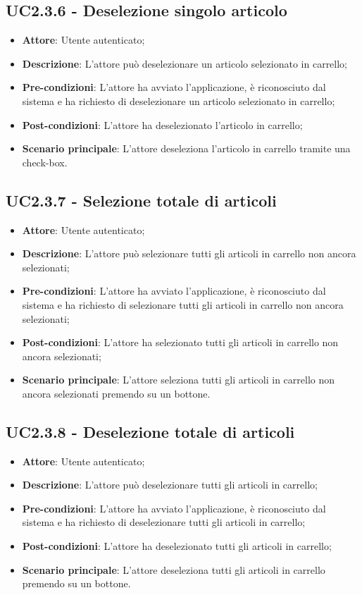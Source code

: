 \subsection{UC2.3.6 - Deselezione singolo articolo}

\begin{itemize}
	\item \textbf{Attore}: Utente autenticato;
	\item \textbf{Descrizione}: L'attore può deselezionare un articolo selezionato in carrello;
	\item \textbf{Pre-condizioni}: L'attore ha avviato l'applicazione, è riconosciuto dal sistema e ha richiesto di deselezionare un articolo selezionato in carrello;
	\item \textbf{Post-condizioni}: L'attore ha deselezionato l'articolo in carrello;
	\item \textbf{Scenario principale}: L'attore deseleziona l'articolo in carrello tramite una check-box.
\end{itemize}

\subsection{UC2.3.7 - Selezione totale di articoli}

\begin{itemize}
	\item \textbf{Attore}: Utente autenticato;
	\item \textbf{Descrizione}: L'attore può selezionare tutti gli articoli in carrello non ancora selezionati;
	\item \textbf{Pre-condizioni}: L'attore ha avviato l'applicazione, è riconosciuto dal sistema e ha richiesto di selezionare tutti gli articoli in carrello non ancora selezionati;
	\item \textbf{Post-condizioni}: L'attore ha selezionato tutti gli articoli in carrello non ancora selezionati;
	\item \textbf{Scenario principale}: L'attore seleziona tutti gli articoli in carrello non ancora selezionati premendo su un bottone.
\end{itemize}

\subsection{UC2.3.8 - Deselezione totale di articoli}

\begin{itemize}
	\item \textbf{Attore}: Utente autenticato;
	\item \textbf{Descrizione}: L'attore può deselezionare tutti gli articoli in carrello;
	\item \textbf{Pre-condizioni}: L'attore ha avviato l'applicazione, è riconosciuto dal sistema e ha richiesto di deselezionare tutti gli articoli in carrello;
	\item \textbf{Post-condizioni}: L'attore ha deselezionato tutti gli articoli in carrello;
	\item \textbf{Scenario principale}: L'attore deseleziona tutti gli articoli in carrello premendo su un bottone.
\end{itemize}

